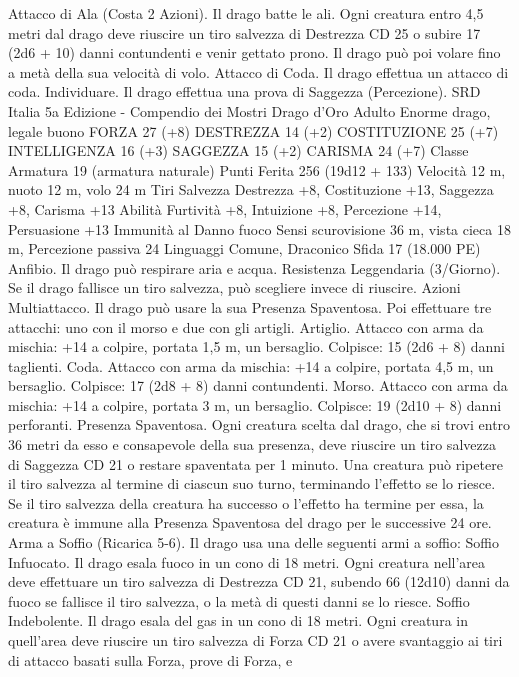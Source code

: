 \begin{multicols}{2}
Attacco di Ala (Costa 2 Azioni). Il drago batte le ali. Ogni
creatura entro 4,5 metri dal drago deve riuscire un tiro salvezza
di Destrezza CD 25 o subire 17 (2d6 + 10) danni contundenti e
venir gettato prono. Il drago può poi volare fino a metà della sua
velocità di volo.
Attacco di Coda. Il drago effettua un attacco di coda.
Individuare. Il drago effettua una prova di Saggezza
(Percezione).
SRD Italia 5a Edizione - Compendio dei Mostri
Drago d’Oro Adulto
Enorme drago, legale buono
FORZA 27 (+8)
DESTREZZA 14 (+2)
COSTITUZIONE 25 (+7)
INTELLIGENZA 16 (+3)
SAGGEZZA 15 (+2)
CARISMA 24 (+7)
Classe Armatura 19 (armatura naturale)
Punti Ferita 256 (19d12 + 133)
Velocità 12 m, nuoto 12 m, volo 24 m
Tiri Salvezza Destrezza +8, Costituzione +13, Saggezza +8,
Carisma +13
Abilità Furtività +8, Intuizione +8, Percezione +14, Persuasione +13
Immunità al Danno fuoco
Sensi scurovisione 36 m, vista cieca 18 m, Percezione passiva 24
Linguaggi Comune, Draconico
Sfida 17 (18.000 PE)
Anfibio. Il drago può respirare aria e acqua.
Resistenza Leggendaria (3/Giorno). Se il drago fallisce un tiro
salvezza, può scegliere invece di riuscire.
Azioni
Multiattacco. Il drago può usare la sua Presenza Spaventosa. Poi
effettuare tre attacchi: uno con il morso e due con gli artigli.
Artiglio. Attacco con arma da mischia: +14 a colpire, portata 1,5
m, un bersaglio.
Colpisce: 15 (2d6 + 8) danni taglienti.
Coda. Attacco con arma da mischia: +14 a colpire, portata 4,5
m, un bersaglio.
Colpisce: 17 (2d8 + 8) danni contundenti.
Morso. Attacco con arma da mischia: +14 a colpire, portata 3 m,
un bersaglio.
Colpisce: 19 (2d10 + 8) danni perforanti.
Presenza Spaventosa. Ogni creatura scelta dal drago, che si trovi
entro 36 metri da esso e consapevole della sua presenza, deve
riuscire un tiro salvezza di Saggezza CD 21 o restare spaventata per
1 minuto. Una creatura può ripetere il tiro salvezza al termine di
ciascun suo turno, terminando l’effetto se lo riesce. Se il tiro salvezza
della creatura ha successo o l’effetto ha termine per essa, la creatura è
immune alla Presenza Spaventosa del drago per le successive 24 ore.
Arma a Soffio (Ricarica 5-6). Il drago usa una delle seguenti armi
a soffio:
Soffio Infuocato. Il drago esala fuoco in un cono di 18 metri. Ogni
creatura nell’area deve effettuare un tiro salvezza di Destrezza CD
21, subendo 66 (12d10) danni da fuoco se fallisce il tiro salvezza, o
la metà di questi danni se lo riesce.
Soffio Indebolente. Il drago esala del gas in un cono di 18 metri. Ogni
creatura in quell’area deve riuscire un tiro salvezza di Forza CD 21 o
avere svantaggio ai tiri di attacco basati sulla Forza, prove di Forza, e

\end{multicols}
